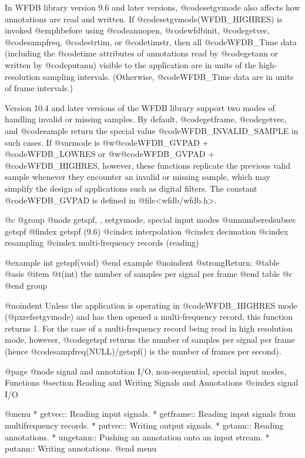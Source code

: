{{{{{{{{{In WFDB library version 9.6 and later versions, @code{setgvmode} also affects
how annotations are read and written.  If @code{setgvmode(WFDB_HIGHRES)} is
invoked @emph{before} using @code{annopen}, @code{wfdbinit}, @code{getvec},
@code{sampfreq}, @code{strtim}, or @code{timstr}, then all @code{WFDB_Time}
data (including the @code{time} attributes of annotations read by @code{getann}
or written by @code{putann}) visible to the application are in units of the
high-resolution sampling intervals.  (Otherwise, @code{WFDB_Time} data are in
units of frame intervals.)

Version 10.4 and later versions of the WFDB library support two modes
of handling invalid or missing samples.  By default, @code{getframe},
@code{getvec}, and @code{sample} return the special value
@code{WFDB_INVALID_SAMPLE} in such cases.  If @var{mode} is
@w{@code{WFDB_GVPAD} + @code{WFDB_LOWRES}} or 
@w{@code{WFDB_GVPAD} + @code{WFDB_HIGHRES}},
however, these functions replicate the previous
valid sample whenever they encounter an invalid or missing sample,
which may simplify the design of applications such as digital filters.
The constant @code{WFDB_GVPAD} is defined in @file{<wfdb/wfdb.h>}.

@c @group
@node     getspf, , setgvmode, special input modes
@unnumberedsubsec getspf
@findex getspf (9.6)
@cindex interpolation
@cindex decimation
@cindex resampling
@cindex multi-frequency records (reading)

@example
int getspf(void)
@end example
@noindent
@strong{Return:}
@table @asis
@item @t{(int)}
the number of samples per signal per frame
@end table
@c @end group

@noindent
Unless the application is operating in @code{WFDB_HIGHRES} mode
(@pxref{setgvmode}) and has then opened a multi-frequency record, this
function returns 1.  For the case of a multi-frequency record being read
in high resolution mode, however, @code{getspf} returns the number of
samples per signal per frame (hence @code{sampfreq(NULL)/getspf()} is
the number of frames per second).

@page
@node     signal and annotation I/O, non-sequential, special input modes, Functions
@section Reading and Writing Signals and Annotations
@cindex signal I/O

@menu
* getvec::		Reading input signals.
* getframe::            Reading input signals from multifrequency records.
* putvec::		Writing output signals.
* getann::		Reading annotations.
* ungetann::		Pushing an annotation onto an input stream.
* putann::		Writing annotations.
@end menu

}}}}}}}}}
